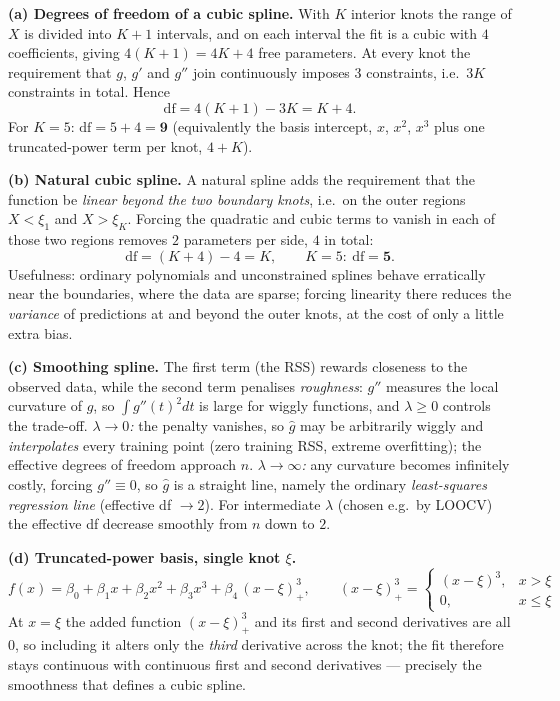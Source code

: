 \documentclass[11pt,a4paper]{article}
\begin{document}
\ifdefined\withsolutions
\begin{solutionbox}
\textbf{(a) Degrees of freedom of a cubic spline.}
With $K$ interior knots the range of $X$ is divided into $K+1$ intervals, and on each interval
the fit is a cubic with $4$ coefficients, giving $4(K+1)=4K+4$ free parameters. At every knot
the requirement that $g$, $g'$ and $g''$ join continuously imposes $3$ constraints, i.e.\ $3K$
constraints in total. Hence
\[
  \mathrm{df}=4(K+1)-3K=K+4 .
\]
For $K=5$: $\mathrm{df}=5+4=\mathbf{9}$ (equivalently the basis intercept, $x$, $x^2$, $x^3$
plus one truncated-power term per knot, $4+K$).

\medskip
\textbf{(b) Natural cubic spline.}
A natural spline adds the requirement that the function be \emph{linear beyond the two boundary
knots}, i.e.\ on the outer regions $X<\xi_1$ and $X>\xi_K$. Forcing the quadratic and cubic
terms to vanish in each of those two regions removes $2$ parameters per side, $4$ in total:
\[
  \mathrm{df}=(K+4)-4=K,\qquad K=5:\ \mathrm{df}=\mathbf{5}.
\]
Usefulness: ordinary polynomials and unconstrained splines behave erratically near the
boundaries, where the data are sparse; forcing linearity there reduces the \emph{variance} of
predictions at and beyond the outer knots, at the cost of only a little extra bias.

\medskip
\textbf{(c) Smoothing spline.}
The first term (the RSS) rewards closeness to the observed data, while the second term
penalises \emph{roughness}: $g''$ measures the local curvature of $g$, so $\int g''(t)^2dt$ is
large for wiggly functions, and $\lambda\ge 0$ controls the trade-off.
\emph{$\lambda\to 0$:} the penalty vanishes, so $\hat{g}$ may be arbitrarily wiggly and
\emph{interpolates} every training point (zero training RSS, extreme overfitting); the
effective degrees of freedom approach $n$.
\emph{$\lambda\to\infty$:} any curvature becomes infinitely costly, forcing $g''\equiv 0$, so
$\hat{g}$ is a straight line, namely the ordinary \emph{least-squares regression line}
(effective df $\to 2$). For intermediate $\lambda$ (chosen e.g.\ by LOOCV) the effective df
decrease smoothly from $n$ down to $2$.

\medskip
\textbf{(d) Truncated-power basis, single knot $\xi$.}
\[
  f(x)=\beta_0+\beta_1x+\beta_2x^2+\beta_3x^3+\beta_4\,(x-\xi)^3_+,
  \qquad
  (x-\xi)^3_+=\begin{cases}(x-\xi)^3, & x>\xi\\[0.5mm] 0, & x\le\xi\end{cases}
\]
At $x=\xi$ the added function $(x-\xi)^3_+$ and its first and second derivatives are all $0$, so
including it alters only the \emph{third} derivative across the knot; the fit therefore stays
continuous with continuous first and second derivatives --- precisely the smoothness that
defines a cubic spline.
\end{solutionbox}
\fi
\end{document}
